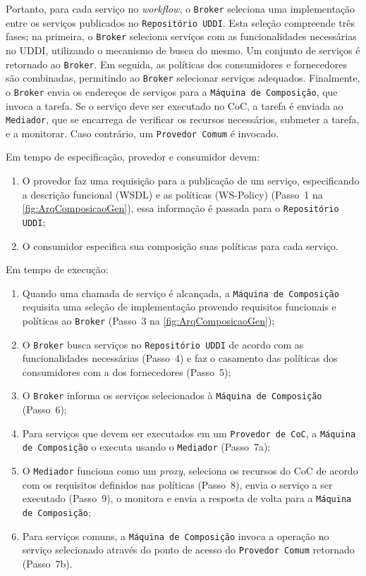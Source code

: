 \documentclass[12pt]{report} %
\begin{document}
	Portanto, para cada serviço no \textit{workflow}, o \texttt{Broker} seleciona  uma implementação entre os serviços publicados no \texttt{Repositório UDDI}.
	Esta seleção compreende três fases;
	na primeira, o \texttt{Broker} seleciona serviços com as funcionalidades necessárias no UDDI, utilizando o mecanismo de busca do mesmo.
	Um conjunto de serviços é retornado ao \texttt{Broker}.
	Em seguida, as políticas dos consumidores e fornecedores são combinadas, permitindo ao \texttt{Broker} selecionar serviços adequados.
	Finalmente, o \texttt{Broker} envia os endereços de serviços para a \texttt{Máquina de Composição}, que invoca a tarefa.
	Se o serviço deve ser executado no CoC, a tarefa é enviada ao \texttt{Mediador}, que se encarrega de verificar os recursos necessários, submeter a tarefa, e a monitorar.
	Caso contrário, um \texttt{Provedor Comum} é invocado.	

	Em tempo de especificação, provedor e consumidor devem:
	\begin{enumerate}
	    \item O provedor faz uma requisição para a publicação de um serviço, especificando a descrição funcional (WSDL) e as políticas (WS-Policy) (Passo~1 na \autoref{fig:ArqComposicaoGen}), essa informação é passada para o \texttt{Repositório UDDI};
	    \item O consumidor especifica sua composição suas políticas para cada serviço.
	\end{enumerate}

	Em tempo de execução:
	\begin{enumerate}
	    \item Quando uma chamada de serviço é alcançada, a \texttt{Máquina de Composição} requisita uma seleção de implementação provendo requisitos funcionais e políticas ao \texttt{Broker} (Passo~3 na \autoref{fig:ArqComposicaoGen}); 
	    \item O \texttt{Broker} busca serviços no \texttt{Repositório UDDI} de acordo com as funcionalidades necessárias (Passo~4) e faz o casamento das políticas dos consumidores com a dos fornecedores (Passo~5);
	    \item O \texttt{Broker} informa os serviços selecionados à \texttt{Máquina de Composição} (Passo~6);
	    \item Para serviços que devem ser executados em um \texttt{Provedor de CoC}, a \texttt{Máquina de Composição} o executa usando o \texttt{Mediador} (Passo~7a);
	    \item O \texttt{Mediador} funciona como um \textit{proxy}, seleciona os recursos do CoC de acordo com os requisitos definidos nas políticas (Passo~8), envia o serviço a ser executado (Passo~9), o monitora e envia a resposta de volta para a \texttt{Máquina de Composição};
	    \item Para serviços comuns, a \texttt{Máquina de Composição} invoca a operação no serviço selecionado através do ponto de acesso do \texttt{Provedor Comum} retornado (Passo~7b).	   
	\end{enumerate}	
\end{document}
